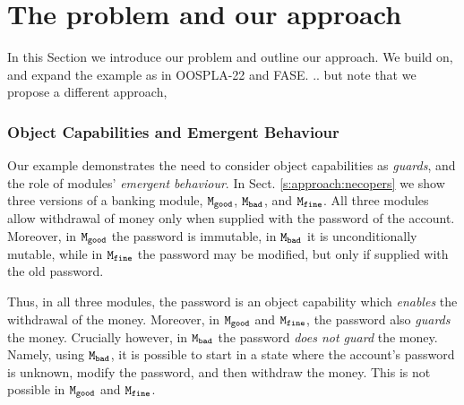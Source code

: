 

\section{The problem and our approach}
\label{s:outline}
 
In this Section we introduce our problem and outline our approach. 
 We build on, and expand the  example as in OOSPLA-22 and FASE. .. but note that we propose a different approach, %

 
  \subsubsection{Object Capabilities and Emergent Behaviour} %
\label{s:bank}
Our example  demonstrates the need to consider object capabilities as \emph{guards}, and the role
of {modules'} \emph{emergent behaviour}. 
%
In Sect.  \ref{s:approach:necopers} we show three versions of a banking module, ${\texttt{M}}_{{\texttt{good}}}$, ${\texttt{M}}_{{\texttt{bad}}}$, and ${\texttt{M}}_{{\texttt{fine}}}$. 
All three modules allow withdrawal of  money only when supplied with the password of the account.
Moreover, in ${\texttt{M}}_{{\texttt{good}}}$ the password is immutable, in ${\texttt{M}}_{{\texttt{bad}}}$ it is unconditionally mutable, while in ${\texttt{M}}_{{\texttt{fine}}}$ the password may be modified, but only if supplied with the old password. 


{Thus, in all three modules, the password is an object capability which \emph{enables} the withdrawal of the money. 
Moreover, in ${\texttt{M}}_{{\texttt{good}}}$ and ${\texttt{M}}_{{\texttt{fine}}}$, the password also \emph{guards} the money.
Crucially however,  in ${\texttt{M}}_{{\texttt{bad}}}$ the password \emph{does not guard} the money. 
 Namely, using ${\texttt{M}}_{{\texttt{bad}}}$, it is possible to start in a state where the account's password is unknown, modify the password, and then withdraw the money. 
 This is not possible  in ${\texttt{M}}_{{\texttt{good}}}$ and ${\texttt{M}}_{{\texttt{fine}}}$.
}

